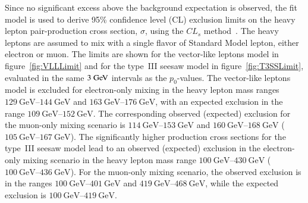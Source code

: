 Since no significant excess above the background expectation is observed, the fit model is used to derive 95\% confidence level (CL) exclusion limits on the heavy lepton pair-production cross section, $\sigma$, using the $CL_s$ method~\cite{cls}. The heavy leptons are assumed to mix with a single flavor of Standard Model lepton, either electron or muon. The limits are shown for the vector-like leptons model in figure~\ref{fig:VLLLimit} and for the type~III seesaw model in figure~\ref{fig:T3SSLimit}, evaluated in the same $3 \GeV$ intervals as the $p_0$-values.
The vector-like leptons model is excluded for electron-only mixing in the heavy lepton mass ranges $\SIrange[range-phrase=-]{129}{144}{\giga\electronvolt}$ and $\SIrange[range-phrase=-]{163}{176}{\giga\electronvolt}$, with an expected exclusion in the range $\SIrange[range-phrase=-]{109}{152}{\giga\electronvolt}$. The corresponding observed (expected) exclusion for the muon-only mixing scenario is $\SIrange[range-phrase=-]{114}{153}{\giga\electronvolt}$ and $\SIrange[range-phrase=-]{160}{168}{\giga\electronvolt}$ ($\SIrange[range-phrase=-]{105}{167}{\giga\electronvolt}$).
The significantly higher production cross sections for the type~III seesaw model lead to an observed (expected) exclusion in the electron-only mixing scenario in the heavy lepton mass range $\SIrange[range-phrase=-]{100}{430}{\giga\electronvolt}$  ($\SIrange[range-phrase=-]{100}{436}{\giga\electronvolt}$). For the muon-only mixing scenario, the observed exclusion is in the ranges $\SIrange[range-phrase=-]{100}{401}{\giga\electronvolt}$ and $\SIrange[range-phrase=-]{419}{468}{\giga\electronvolt}$, while the expected exclusion is $\SIrange[range-phrase=-]{100}{419}{\giga\electronvolt}$.

